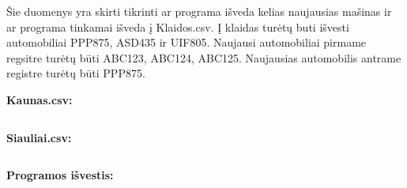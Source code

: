 \documentclass{article}
\begin{document}
Šie duomenys yra skirti tikrinti ar programa išveda kelias naujausias mašinas ir ar programa tinkamai išveda į Klaidos.csv.
Į klaidas turėtų buti išvesti automobiliai PPP875, ASD435 ir UIF805.
Naujausi automobiliai pirmame regsitre turėtų būti ABC123, ABC124, ABC125.
Naujausias automobilis antrame registre turėtų būti PPP875.


\begin{changemargin}{0cm}{0cm}
    \textbf{Kaunas.csv:}
\end{changemargin}

\inputminted{csharp}{Assets/L3/test2-input1.txt}

\begin{changemargin}{0cm}{0cm}
    \textbf{Siauliai.csv:}
\end{changemargin}

\inputminted{csharp}{Assets/L3/test2-input2.txt}



\textbf{Programos išvestis:}
\end{document}
